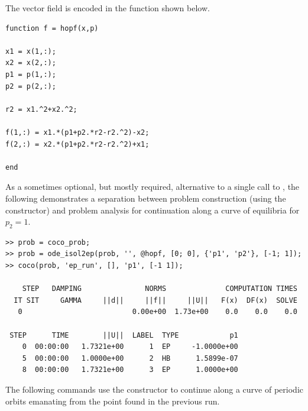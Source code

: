 The vector field is encoded in the  function shown below.
\begin{lstlisting}[language=coco-highlight,frame=shadowbox]
function f = hopf(x,p)

x1 = x(1,:);
x2 = x(2,:);
p1 = p(1,:);
p2 = p(2,:);

r2 = x1.^2+x2.^2;

f(1,:) = x1.*(p1+p2.*r2-r2.^2)-x2;
f(2,:) = x2.*(p1+p2.*r2-r2.^2)+x1;

end
\end{lstlisting}
As a sometimes optional, but mostly required, alternative to a single call to , the following demonstrates a separation between problem construction (using the  constructor) and problem analysis for continuation along a curve of equilibria for $p_2=1$.
\begin{lstlisting}[language=coco-highlight,frame=lines]
>> prob = coco_prob;
>> prob = ode_isol2ep(prob, '', @hopf, [0; 0], {'p1', 'p2'}, [-1; 1]);
>> coco(prob, 'ep_run', [], 'p1', [-1 1]);

    STEP   DAMPING               NORMS              COMPUTATION TIMES
  IT SIT     GAMMA     ||d||     ||f||     ||U||   F(x)  DF(x)  SOLVE
   0                          0.00e+00  1.73e+00    0.0    0.0    0.0

 STEP      TIME        ||U||  LABEL  TYPE            p1
    0  00:00:00   1.7321e+00      1  EP     -1.0000e+00
    5  00:00:00   1.0000e+00      2  HB      1.5899e-07
    8  00:00:00   1.7321e+00      3  EP      1.0000e+00
\end{lstlisting}
The following commands use the constructor  to continue along a curve of periodic orbits emanating from the  point found in the previous run.
